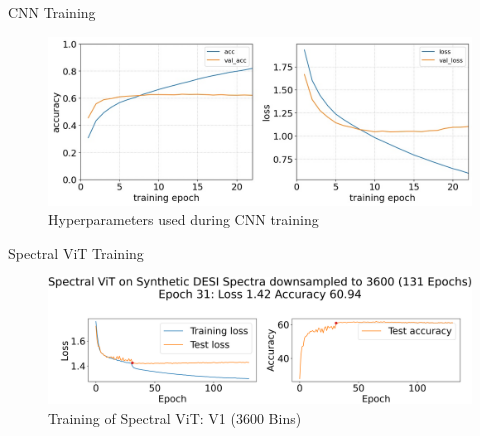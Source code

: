 \begin{frame}{CNN Training}
    \begin{table}[t!]
        \small
        \centering
        \sffamily
        \resizebox{.6\linewidth}{!}{}
        \caption{Hyperparameters of the CNN, model adapted from \textcite{Sepeku2022}.}
        \label{tab:cnn_hyperparameters}
    \end{table}
    \begin{figure}[b!]
        \centering
        \includegraphics[width=.65\linewidth]{figures/cnn/cnn_training_history.jpg}
        \caption{Hyperparameters used during CNN training \parencite{Sepeku2022}}
        \label{fig:cnn_training}
    \end{figure}
\end{frame}


\begin{frame}{Spectral ViT Training}
    \begin{table}[t!]
        \small
        \centering
        \sffamily
        \resizebox{.6\linewidth}{!}{}
        \caption{Hyperparameters used during Spectral ViT training}
        \label{tab:t_hyper}
    \end{table}
    
    \begin{figure}[b!]
        \centering
        \includegraphics[width=\linewidth]{figures/Presentation/v1/vit_model_V1_original_redotraining_new.png}
        \caption{Training of Spectral ViT: V1 (3600 Bins)}
        \label{fig:vit1_training}
    \end{figure}
\end{frame}


